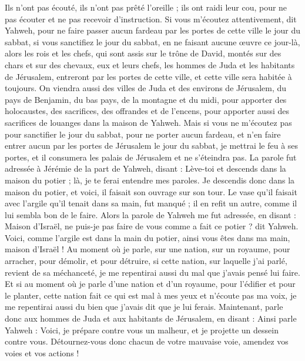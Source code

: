 \begin{multicols}{2}
Ils n'ont pas écouté, ils n'ont pas prêté l'oreille ; ils ont raidi leur cou, pour ne pas écouter et ne pas recevoir d'instruction.
Si vous m'écoutez attentivement, dit Yahweh, pour ne faire passer aucun fardeau par les portes de cette ville le jour du sabbat, si vous sanctifiez le jour du sabbat, en ne faisant aucune œuvre ce jour-là,
alors les rois et les chefs, qui sont assis sur le trône de David, montés sur des chars et sur des chevaux, eux et leurs chefs, les hommes de Juda et les habitants de Jérusalem, entreront par les portes de cette ville, et cette ville sera habitée à toujours.
On viendra aussi des villes de Juda et des environs de Jérusalem, du pays de Benjamin, du bas pays, de la montagne et du midi, pour apporter des holocaustes, des sacrifices, des offrandes et de l'encens, pour apporter aussi des sacrifices de louanges dans la maison de Yahweh.
Mais si vous ne m'écoutez pas pour sanctifier le jour du sabbat, pour ne porter aucun fardeau, et n'en faire entrer aucun par les portes de Jérusalem le jour du sabbat, je mettrai le feu à ses portes, et il consumera les palais de Jérusalem et ne s'éteindra pas.
\VerseOne{}La parole fut adressée à Jérémie de la part de Yahweh, disant :
Lève-toi et descends dans la maison du potier ; là, je te ferai entendre mes paroles.
Je descendis donc dans la maison du potier, et voici, il faisait son ouvrage sur son tour.
Le vase qu'il faisait avec l'argile qu'il tenait dans sa main, fut manqué ; il en refit un autre, comme il lui sembla bon de le faire.
Alors la parole de Yahweh me fut adressée, en disant :
Maison d'Israël, ne puis-je pas faire de vous comme a fait ce potier ? dit Yahweh. Voici, comme l'argile est dans la main du potier, ainsi vous êtes dans ma main, maison d'Israël !
Au moment où je parle, sur une nation, sur un royaume, pour arracher, pour démolir, et pour détruire,
si cette nation, sur laquelle j'ai parlé, revient de sa méchanceté, je me repentirai aussi du mal que j'avais pensé lui faire.
Et si au moment où je parle d'une nation et d'un royaume, pour l'édifier et pour le planter,
cette nation fait ce qui est mal à mes yeux et n'écoute pas ma voix, je me repentirai aussi du bien que j'avais dit que je lui ferais.
Maintenant, parle donc aux hommes de Juda et aux habitants de Jérusalem, en disant : Ainsi parle Yahweh : Voici, je prépare contre vous un malheur, et je projette un dessein contre vous. Détournez-vous donc chacun de votre mauvaise voie, amendez vos voies et vos actions !

\end{multicols}

